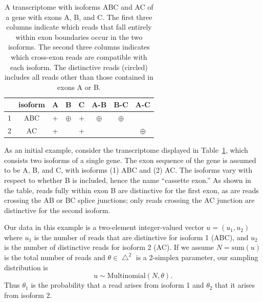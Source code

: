 \documentclass[11pt]{report}
\newcommand{\rdistro}[2]{\textrm{#1}\!\left( #2 \right)}
\newcommand{\mycaption}[2]{\caption{#2}\label{#1}}
\begin{document}
\begin{table}
  \centering
  \begin{tabular}{l|c||ccc|ccc|}
     & isoform & A & B & C & A-B & B-C & A-C
    \\ \hline \hline
    1 & ABC  & + & $\oplus$ & + & $\oplus$ & $\oplus$ &                                   
    \\
    2 & AC   & + & & + & & & $\oplus$
  \end{tabular}
  \mycaption{table:abc-experiment1}{A transcriptome with isoforms ABC
    and AC of a gene with exons A, B, and C.  The first three columns
    indicate which reads that fall entirely within exon boundaries
    occur in the two isoforms.  The second three columns indicates
    which cross-exon reads are compatible with each isoform.  The
    distinctive reads (circled) includes all reads other than those
    contained in exons A or B.}
\end{table}
As an initial example, consider the transcriptome displayed in
Table~\ref{table:abc-experiment1}, which consists two isoforms of a
single gene.  The exon sequence of the gene is assumed to be A, B, and
C, with isoforms (1) ABC and (2) AC.  The isoforms vary with respect
to whether B is included, hence the name ``cassette exon.''  As shown
in the table, reads fully within exon B are distinctive for the first
exon, as are reads crossing the AB or BC splice junctions; only reads
crossing the AC junction are distinctive for the second isoform.

Our data in this example is a two-element integer-valued vector
$u = (u_1, u_2)$ where $u_1$ is the number of reads that are
distinctive for isoform 1 (ABC), and $u_2$ is the number of
distinctive reads for isoform 2 (AC).  If we assume $N =
\textrm{sum}(u)$ is the total number of reads and $\theta \in
\bigtriangleup^2$ is a 2-simplex parameter, our sampling distribution
is
\[
  u \sim \rdistro{Multinomial}{N, \theta}.
\]
Thus $\theta_1$ is the probability that a read arises from isoform 1
and $\theta_2$ that it arises from isoform 2.
\end{document}
